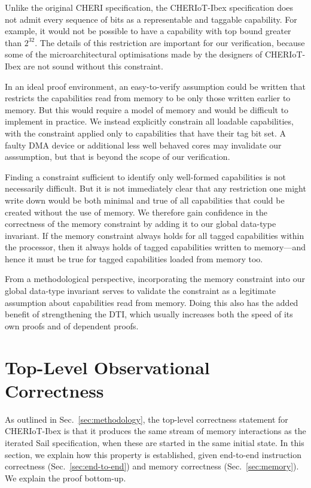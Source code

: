 \documentclass[10pt,conference]{IEEEtran}
\begin{document}
Unlike the original CHERI specification, the CHERIoT-Ibex specification
does not admit every sequence of bits as a representable and taggable
capability.  For example, it would not be possible to have a capability
with top bound greater than $2^{32}$. The details of this restriction are
important for our verification, because some of the microarchitectural
optimisations made by the designers of CHERIoT-Ibex are not sound without
this constraint.

In an ideal proof environment, an easy-to-verify assumption could be
written that restricts the capabilities read from memory to be only those
written earlier to memory.  But this would require a model of memory and
would be difficult to implement in practice.  We instead explicitly
constrain all loadable capabilities, with the constraint applied only to
capabilities that have their tag bit set. A faulty DMA device or additional
less well behaved cores may invalidate our asssumption, but that is beyond
the scope of our verification.

Finding a constraint sufficient to identify only well-formed capabilities
is not necessarily difficult.  But it is not immediately clear that any
restriction one might write down would be both minimal and true of all
capabilities that could be created without the use of memory.  We therefore
gain confidence in the correctness of the memory constraint by adding it to
our global data-type invariant. If the memory constraint always holds for
all tagged capabilities within the processor, then it always holds of
tagged capabilities written to memory---and hence it must be true for tagged
capabilities loaded from memory too.

From a methodological perspective, incorporating the memory constraint into
our global data-type invariant serves to validate the constraint as a
legitimate assumption about capabilities read from memory. Doing this also
has the added benefit of strengthening the DTI, which usually increases
both the speed of its own proofs and of dependent proofs. 

\section{Top-Level Observational Correctness}\label{sec:obs}

As outlined in Sec.~\ref{sec:methodology}, the top-level correctness
statement for CHERIoT-Ibex is that it produces the same stream of memory
interactions as the iterated Sail specification, when these are started in
the same initial state. In this section, we explain how this property is
established, given end-to-end instruction correctness
(Sec.~\ref{sec:end-to-end}) and memory correctness
(Sec.~\ref{sec:memory}). We explain the proof bottom-up.
\end{document}

